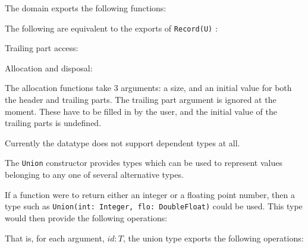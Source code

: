 The domain exports the following functions:

The following are equivalent to the exports of \verb+Record(U)+ :


Trailing part access:


Allocation and disposal:


The allocation functions take 3 arguments: a size, and an initial value for both
the header and trailing parts.  The trailing part argument is ignored at the
moment.  These have to be filled in by the user, and the initial value of the
trailing parts is undefined.

Currently the datatype does not support dependent types at all.


%
%
%
The \verb+Union+ constructor provides types which can be used
to represent values belonging to any one of several alternative types.

If a function were to return either an integer or a 
floating point number, then a type such as
\verb"Union(int: Integer, flo: DoubleFloat)"
could be used.
This type would then provide the following operations:


That is, for each argument, $ id : T $, the union type exports
the following operations:


